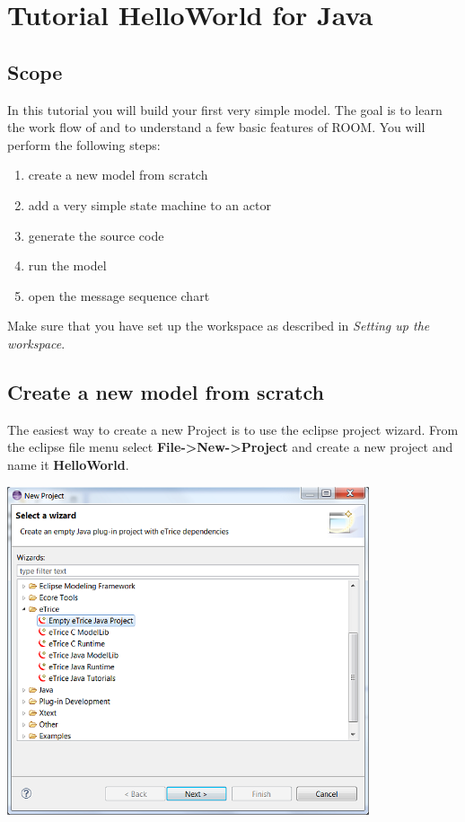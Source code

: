 \chapter{Tutorial HelloWorld for Java}

\section{Scope}

In this tutorial you will build your first very simple \eTrice{} model. The goal is to learn the work flow of 
\eTrice{} and to understand a few basic features of ROOM. You will perform the following steps:

\begin{enumerate}
\item create a new model from scratch
\item add a very simple state machine to an actor
\item generate the source code
\item run the model
\item open the message sequence chart
\end{enumerate}

Make sure that you have set up the workspace as described in \textit{Setting up the workspace}.

\section{Create a new model from scratch}

The easiest way to create a new \eTrice{} Project is to use the eclipse project wizard. From the eclipse file 
menu select \textbf{File->New->Project} and create a new \eTrice{} project and name it \textbf{HelloWorld}.

\includegraphics[width=0.8\textwidth]{images/015-HelloWorld10.png}

